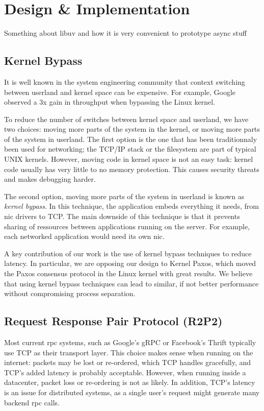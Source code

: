 \chapter{Design \& Implementation}

Something about libuv and how it is very convenient to prototype async stuff

\section{Kernel Bypass}

It is well known in the system engineering community that context switching between userland and kernel space can be expensive.
For example, Google observed a 3x gain in throughput when bypassing the Linux kernel\cite{maglev}.

To reduce the number of switches between kernel space and userland, we have two choices: moving more parts of the system in the kernel, or moving more parts of the system in userland.  The first option is the one that has been traditionnaly been used for networking; the TCP/IP stack or the filesystem are part of typical UNIX kernels.
However, moving code in kernel space is not an easy task: kernel code usually has very little to no memory protection.
This causes security threats and makes debugging harder.

The second option, moving more parts of the system in userland is known as \emph{kernel bypass}.
In this technique, the application embeds everything it needs, from \gls{nic} drivers to TCP.
The main downside of this technique is that it prevents sharing of ressources between applications running on the server.
For example, each networked application would need its own \gls{nic}.

A key contribution of our work is the use of kernel bypass techniques to reduce latency.
In particular, we are opposing our design to Kernel Paxos\cite{kernelpaxos}, which moved the Paxos consensus protocol in the Linux kernel with great results.
We believe that using kernel bypass techniques can lead to similar, if not better performance without compromising process separation.

\section{Request Response Pair Protocol (R2P2)}

Most current \gls{rpc} systems, such as Google's gRPC\cite{grpc} or Facebook's Thrift\cite{thrift} typically use TCP as their transport layer.
This choice makes sense when running on the internet: packets may be lost or re-ordered, which TCP handles gracefully, and TCP's added latency is probably acceptable.
However, when running inside a datacenter, packet loss or re-ordering is not as likely.
In addition, TCP's latency is an issue for distributed systems, as a single user's request might generate many backend \gls{rpc} calls.

